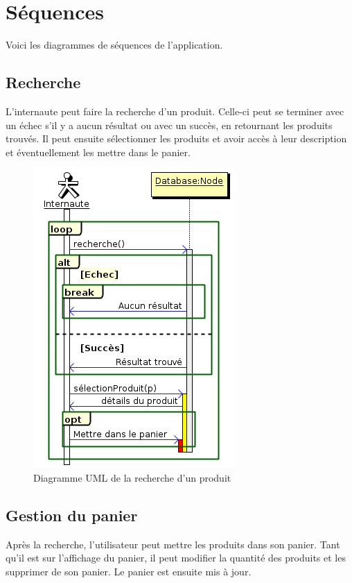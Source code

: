 \documentclass[12pt]{article}
\begin{document}
\newpage
\section{Séquences}

Voici les diagrammes de séquences de l'application.

\subsection{Recherche}

L'internaute peut faire la recherche d'un produit.
Celle-ci peut se terminer avec un échec s'il y a aucun résultat ou
avec un succès, en retournant les produits trouvés.
Il peut ensuite sélectionner les produits et avoir accès à leur description et
éventuellement les mettre dans le panier.

\begin{figure}[ht]
    \center
    \includegraphics[scale=0.7]{../Diagrams/SequenceDiagrams/recherche.png}
    \caption*{Diagramme UML de la recherche d'un produit}
\end{figure}

\subsection{Gestion du panier}

Après la recherche, l'utilisateur peut mettre les produits dans son panier.
Tant qu'il est sur l'affichage du panier, il peut modifier la quantité des produits et les supprimer de son panier.
Le panier est ensuite mis à jour.
\end{document}
